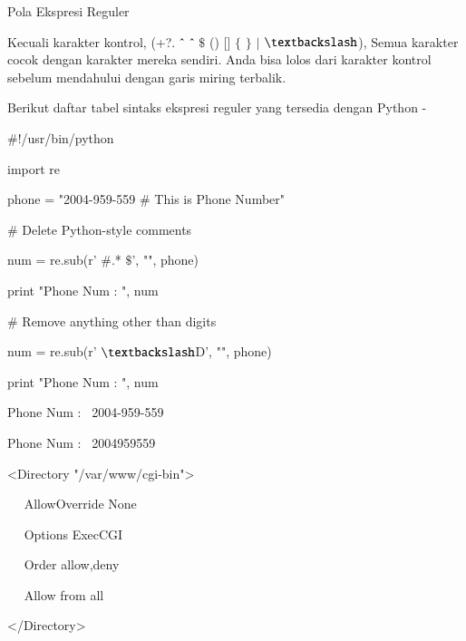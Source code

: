 \documentclass[a4paper,12pt]{report}
\begin{document}


\vspace{12pt}
\vspace{12pt}
\vspace{12pt}
\noindent 
Pola Ekspresi Reguler \par
\vspace{12pt}
\noindent 
Kecuali karakter kontrol, (+?.  $  \string^  $  $  \string^  $  $  \$  $ () []  $  \{  $ $  \}  $  $  \vert  $  $  \textbackslash  $), Semua karakter cocok dengan karakter mereka sendiri. Anda bisa lolos dari karakter kontrol sebelum mendahului dengan garis miring terbalik. \par
\vspace{12pt}
\noindent 
Berikut daftar tabel sintaks ekspresi reguler yang tersedia dengan Python - \par
\noindent 
 $  \#  $!/usr/bin/python \par
\noindent 
import re \par
\vspace{12pt}
\noindent 
phone = "2004-959-559  $  \#  $ This is Phone Number" \par
\vspace{12pt}
\noindent 
 $  \#  $ Delete Python-style comments \par
\noindent 
num = re.sub(r' $  \#  $.* $  \$  $', "", phone) \par
\noindent 
print "Phone Num : ", num \par
\vspace{12pt}
\noindent 
 $  \#  $ Remove anything other than digits \par
\noindent 
num = re.sub(r' $  \textbackslash  $D', "", phone)~~~  \par
\noindent 
print "Phone Num : ", num \par
\vspace{12pt}
\noindent 
Phone Num :~ 2004-959-559 \par
\noindent 
Phone Num :~ 2004959559 \par
\vspace{12pt}
\noindent 
<Directory "/var/www/cgi-bin"> \par
\noindent 
~~ AllowOverride None \par
\noindent 
~~ Options ExecCGI \par
\noindent 
~~ Order allow,deny \par
\noindent 
~~ Allow from all \par
\noindent 
</Directory> \par
\end{document}
